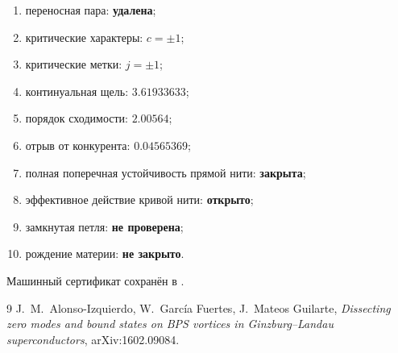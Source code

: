 \begin{protocol}
\begin{enumerate}
 \item переносная пара: \textbf{удалена};
 \item критические характеры: \textbf{$c=\pm1$};
 \item критические метки: \textbf{$j=\pm1$};
 \item континуальная щель: \textbf{$3.61933633$};
 \item порядок сходимости: \textbf{$2.00564$};
 \item отрыв от конкурента: \textbf{$0.04565369$};
 \item полная поперечная устойчивость прямой нити: \textbf{закрыта};
 \item эффективное действие кривой нити: \textbf{открыто};
 \item замкнутая петля: \textbf{не проверена};
 \item рождение материи: \textbf{не закрыто}.
\end{enumerate}
\end{protocol}

Машинный сертификат сохранён в
.

\begin{thebibliography}{9}
J.~M.~Alonso-Izquierdo, W.~Garc\'ia Fuertes, J.~Mateos Guilarte,
\emph{Dissecting zero modes and bound states on BPS vortices in
Ginzburg--Landau superconductors}, arXiv:1602.09084.
\end{thebibliography}